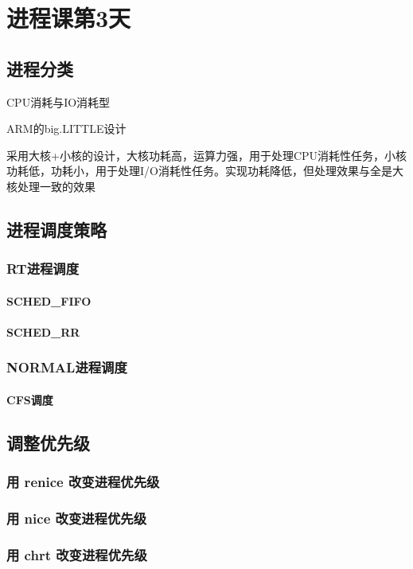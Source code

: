 


\part{进程课第3天}
\chapter{进程分类}
 CPU消耗与IO消耗型
\begin{example*}
  \wdexpbox
  {\caption{ARM的big.LITTLE设计}}
  {采用大核+小核的设计，大核功耗高，运算力强，用于处理CPU消耗性任务，小核功耗低，功耗小，用于处理I/O消耗性任务。实现功耗降低，但处理效果与全是大核处理一致的效果}
\end{example*}

\chapter{进程调度策略}
\section{RT进程调度}
\subsection{SCHED\_FIFO}
\subsection{SCHED\_RR}


\section{NORMAL进程调度}
\subsection{CFS调度}
\clearpage


\chapter{调整优先级}
\section{用 renice 改变进程优先级}
\section{用 nice 改变进程优先级}
\section{用 chrt 改变进程优先级}
\clearpage
